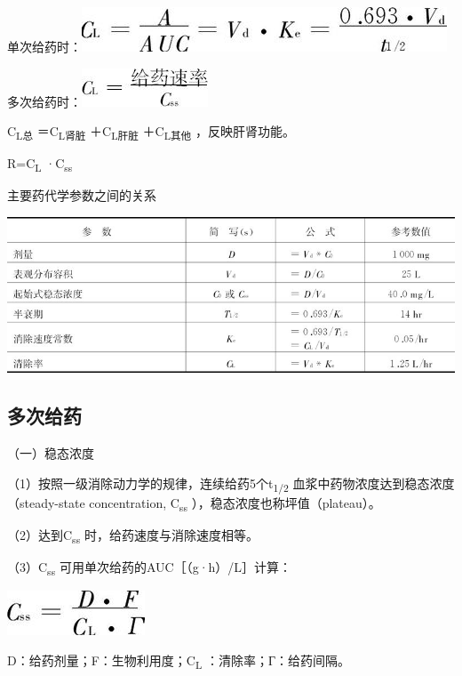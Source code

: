单次给药时：\includegraphics{./images/Image00072.jpg}

多次给药时：\includegraphics{./images/Image00073.jpg}

C\textsubscript{L总} ＝C\textsubscript{L肾脏} ＋C\textsubscript{L肝脏}
＋C\textsubscript{L其他} ，反映肝肾功能。

R=C\textsubscript{L} ·C\textsubscript{ss}

\begin{table}[htbp]
\centering
\caption{主要药代学参数之间的关系}
\label{tab3-7}
\includegraphics{./images/Image00074.jpg}
\end{table}

\subsection{多次给药}

（一）稳态浓度

（1）按照一级消除动力学的规律，连续给药5个t\textsubscript{1/2}
血浆中药物浓度达到稳态浓度（steady-state concentration,
C\textsubscript{ss} ），稳态浓度也称坪值（plateau）。

（2）达到C\textsubscript{ss} 时，给药速度与消除速度相等。

（3）C\textsubscript{ss} 可用单次给药的AUC［（g·h）/L］计算：

\includegraphics{./images/Image00075.jpg}

D：给药剂量；F：生物利用度；C\textsubscript{L} ：清除率；Г：给药间隔。

